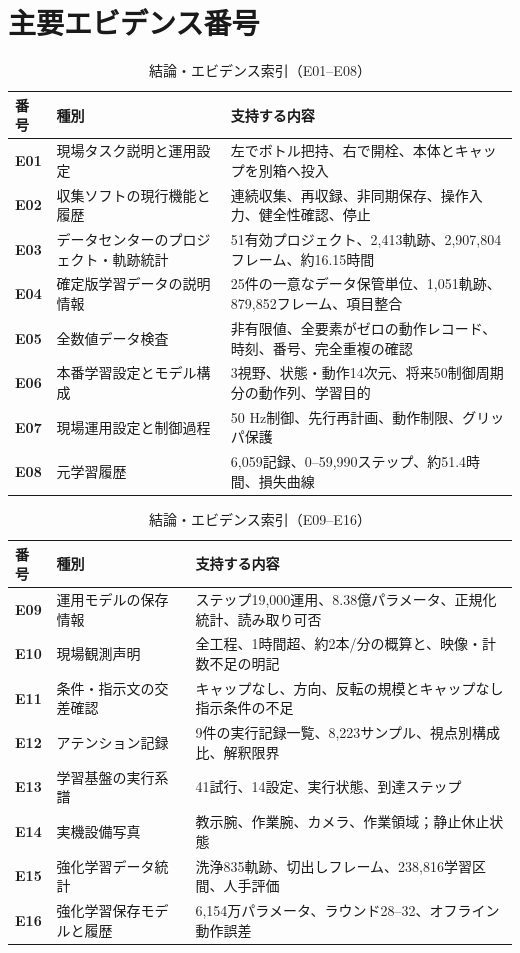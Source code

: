 \section{主要エビデンス番号}

\begin{table}[H]
\centering\small
\caption{結論・エビデンス索引（E01--E08）}
\begin{tabularx}{\textwidth}{>{\bfseries}p{14mm}p{44mm}X}
\toprule
番号 & 種別 & 支持する内容\\
\midrule
E01 & 現場タスク説明と運用設定 & 左でボトル把持、右で開栓、本体とキャップを別箱へ投入\\
E02 & 収集ソフトの現行機能と履歴 & 連続収集、再収録、非同期保存、操作入力、健全性確認、停止\\
E03 & データセンターのプロジェクト・軌跡統計 & 51有効プロジェクト、2,413軌跡、2,907,804フレーム、約16.15時間\\
E04 & 確定版学習データの説明情報 & 25件の一意なデータ保管単位、1,051軌跡、879,852フレーム、項目整合\\
E05 & 全数値データ検査 & 非有限値、全要素がゼロの動作レコード、時刻、番号、完全重複の確認\\
E06 & 本番学習設定とモデル構成 & 3視野、状態・動作14次元、将来50制御周期分の動作列、学習目的\\
E07 & 現場運用設定と制御過程 & 50 Hz制御、先行再計画、動作制限、グリッパ保護\\
E08 & 元学習履歴 & 6,059記録、0--59,990ステップ、約51.4時間、損失曲線\\
\bottomrule
\end{tabularx}
\end{table}

\begin{table}[H]
\centering\small
\caption{結論・エビデンス索引（E09--E16）}
\begin{tabularx}{\textwidth}{>{\bfseries}p{14mm}p{44mm}X}
\toprule
番号 & 種別 & 支持する内容\\
\midrule
E09 & 運用モデルの保存情報 & ステップ19,000運用、8.38億パラメータ、正規化統計、読み取り可否\\
E10 & 現場観測声明 & 全工程、1時間超、約2本/分の概算と、映像・計数不足の明記\\
E11 & 条件・指示文の交差確認 & キャップなし、方向、反転の規模とキャップなし指示条件の不足\\
E12 & アテンション記録 & 9件の実行記録一覧、8,223サンプル、視点別構成比、解釈限界\\
E13 & 学習基盤の実行系譜 & 41試行、14設定、実行状態、到達ステップ\\
E14 & 実機設備写真 & 教示腕、作業腕、カメラ、作業領域；静止休止状態\\
E15 & 強化学習データ統計 & 洗浄835軌跡、切出しフレーム、238,816学習区間、人手評価\\
E16 & 強化学習保存モデルと履歴 & 6,154万パラメータ、ラウンド28--32、オフライン動作誤差\\
\bottomrule
\end{tabularx}
\end{table}

